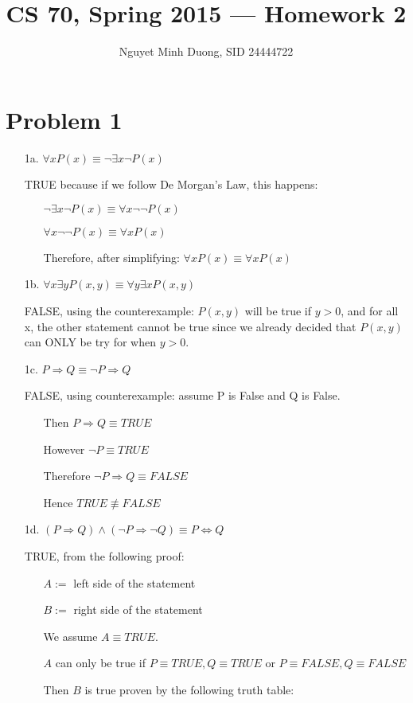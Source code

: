\documentclass[11pt,letterpaper]{article}
\title{CS 70, Spring 2015 --- Homework 2} %
\author{Nguyet Minh Duong, SID 24444722} %
\begin{document}
\maketitle

\section*{Problem 1} 
\begin{enumerate}
	\item[1a.] $\forall x P(x) \equiv \neg \exists x \neg P(x)$ 

	TRUE because if we follow De Morgan's Law, this happens:
	\begin{enumerate}
		\item[] $\neg \exists x \neg P(x) \equiv \forall x \neg \neg P(x)$
		\item[] $\forall x \neg \neg P(x) \equiv \forall x P(x)$
		\item[] Therefore, after simplifying: $\forall x P(x) \equiv \forall x P(x)$
	\end{enumerate}
	\item[1b.] $\forall x \exists y P(x,y) \equiv \forall y \exists x P(x,y)$ 
	
	FALSE, using the counterexample: $P(x,y)$ will be true if $y > 0$, and for all x, the other statement cannot be true since we already decided that $P(x,y)$ can ONLY be try for when $y > 0$. 
	\item[1c.] $P \Rightarrow Q \equiv \neg P \Rightarrow Q$
	
	FALSE, using counterexample: assume P is False and Q is False. 
	\begin{enumerate}
		\item[] Then $P \Rightarrow Q \equiv TRUE$
		\item[] However $\neg P \equiv TRUE$
		\item[] Therefore $\neg P \Rightarrow Q \equiv FALSE$
		\item[] Hence $TRUE \not\equiv FALSE$
	\end{enumerate}		
	\item[1d.] $(P \Rightarrow Q) \land (\neg P \Rightarrow \neg Q) \equiv P \Leftrightarrow Q$
	
	TRUE, from the following proof:
	\begin{enumerate}
		\item[] $A :=$ left side of the statement
		\item[] $B :=$ right side of the statement
		\item[] We assume $A \equiv TRUE$. 
		\item[] $A$ can only be true if $P \equiv TRUE, Q \equiv TRUE$ or $P \equiv FALSE, Q \equiv FALSE$
		\item[] Then $B$ is true proven by the following truth table:
		

\end{enumerate}
\end{enumerate}
\end{document}

